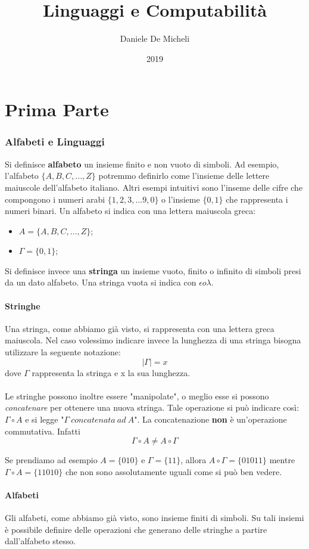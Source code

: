 \documentclass[11pt]{article}
\title{Linguaggi e Computabilità}
\author{Daniele De Micheli}
\date{2019}
\begin{document}
\maketitle
\tableofcontents
\part{Prima Parte}
\section{Alfabeti e Linguaggi}
Si definisce \textbf{alfabeto} un insieme finito e non vuoto di simboli. Ad esempio, l'alfabeto $\{A,B,C,...,Z\}$ potremmo definirlo come l'insieme delle lettere maiuscole dell'alfabeto italiano. Altri esempi intuitivi sono l'inseme delle cifre che compongono i numeri arabi $\{1,2,3,...9,0\}$ o l'insieme $\{0,1\}$ che rappresenta i numeri binari. Un alfabeto si indica con una lettera maiuscola
greca:
\begin{itemize}
	\item $A=\{A,B,C,...,Z\}$;
	\item $\Gamma = \{0,1\}$;
\end{itemize}
Si definisce invece una \textbf{stringa} un insieme vuoto, finito o infinito di simboli presi da un dato alfabeto. Una stringa vuota si indica con $\epsilon o \lambda$.
\subsection{Stringhe}
Una stringa, come abbiamo già visto, si rappresenta con una lettera greca
maiuscola. Nel caso volessimo indicare invece la lunghezza di una stringa
bisogna utilizzare la seguente notazione: $$|\Gamma | = x$$ dove $\Gamma$ rappresenta la stringa e x la sua lunghezza.
\\ \\
Le stringhe possono inoltre essere "manipolate", o meglio esse si possono \textit{concatenare} per ottenere una nuova stringa. Tale operazione si può indicare così: $\Gamma \circ A$ e si legge "$\Gamma \medspace concatenata \medspace ad \medspace A$". La concatenazione \textbf{non} è un'operazione commutativa. Infatti $$\Gamma \circ A \neq A \circ \Gamma$$

Se prendiamo ad esempio $A = \{010\}$ e $\Gamma = \{11\}$, allora $A \circ \Gamma = \{01011\}$ mentre $\Gamma \circ A = \{11010\}$ che non sono assolutamente uguali come si può ben vedere.

\subsection{Alfabeti}
Gli alfabeti, come abbiamo già visto, sono insieme finiti di simboli. Su tali
insiemi  è possibile definire delle operazioni che generano delle stringhe a
partire dall'alfabeto stesso.
\end{document}
